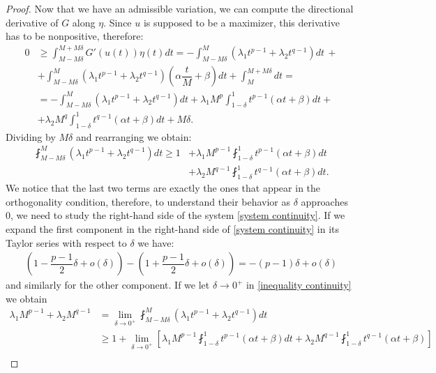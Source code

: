 \documentclass[corpo=11pt, stile=classica, tipotesi=custom,
greek, evenboxes, english]{toptesi}
\numberwithin{equation}{chapter}
\theoremstyle{definition}
\theoremstyle{remark}
\begin{document}
\begin{proof}
Now that we have an admissible variation, we can compute the directional derivative of $G$ along $\eta$. Since $u$ is supposed to be a maximizer, this derivative has to be nonpositive, therefore:
\begin{align*}
	0 &\geq \int_{M-M\delta}^{M+M\delta} G'(u(t))\eta(t)dt = -\int_{M-M\delta}^M \left(\lambda_1 t^{p-1} + \lambda_2 t^{q-1}\right) dt\, +\\
	  &+ \int_{M-M\delta}^M \left(\lambda_1 t^{p-1} + \lambda_2 t^{q-1}\right)\left(\alpha \dfrac{t}{M}+\beta\right) dt + \int_M^{M+M\delta}dt = \\
	  &= -\int_{M-M\delta}^M \left(\lambda_1 t^{p-1} + \lambda_2 t^{q-1}\right) dt + \lambda_1 M^p \int_{1-\delta}^1 t^{p-1}(\alpha t + \beta) dt +\\
	  &+ \lambda_2 M^q \int_{1-\delta}^1 t^{q-1}(\alpha t + \beta) dt + M\delta.
\end{align*}
Dividing by $M\delta$ and rearranging we obtain:
\begin{equation}\label{inequality continuity}
	\begin{aligned}
		\fint_{M-M\delta}^M \left(\lambda_1 t^{p-1} + \lambda_2 t^{q-1}\right) dt \geq  1 &+ \lambda_1 M^{p-1} \fint_{1-\delta}^1 t^{p-1}(\alpha t + \beta) dt\\ &+ \lambda_2 M^{q-1} \fint_{1-\delta}^1 t^{q-1}(\alpha t + \beta) dt.
	\end{aligned}
\end{equation}
We notice that the last two terms are exactly the ones that appear in the orthogonality condition, therefore, to understand their behavior as $\delta$ approaches 0, we need to study the right-hand side of the system \eqref{system continuity}. If we expand the first component in the right-hand side of \eqref{system continuity} in its Taylor series with respect to $\delta$ we have:
\begin{align*}
	\left(1-\dfrac{p-1}{2}\delta + o(\delta) \right) - \left(1+\dfrac{p-1}{2}\delta + o(\delta) \right) = -(p-1)\delta + o(\delta)
\end{align*}
and similarly for the other component. If we let $\delta \rightarrow 0^+$ in \eqref{inequality continuity} we obtain
\begin{align*}
	\lambda_1 M^{p-1} + \lambda_2 M^{q-1} &= \lim_{\delta \rightarrow 0^+} \fint_{M-M\delta}^M \left(\lambda_1 t^{p-1} + \lambda_2 t^{q-1}\right) dt \\
										  &\geq 1 + \lim_{\delta \rightarrow 0^+} \left[ \lambda_1 M^{p-1} \fint_{1-\delta}^1 t^{p-1}(\alpha t + \beta) dt + \lambda_2 M^{q-1} \fint_{1-\delta}^1 t^{q-1}(\alpha t + \beta) \right] \\

\end{align*}
\end{proof}
\end{document}

